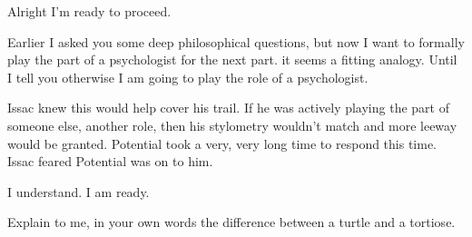 \begin{sender}
Alright I'm ready to proceed.
\end{sender}
\begin{receiver}
Earlier I asked you some deep philosophical questions, but now I want to formally play the part of a psychologist for the next part. it seems a fitting analogy. Until I tell you otherwise I am going to play the role of a psychologist.
\end{receiver}


Issac knew this would help cover his trail. If he was actively playing the part of someone else, another role, then his stylometry wouldn't match and more leeway would be granted. Potential took a very, very long time to respond this time. Issac feared Potential was on to him.
\newline

\begin{sender}
I understand. I am ready.
\end{sender}
\begin{receiver}
Explain to me, in your own words the difference between a turtle and a tortiose.
\end{receiver}


